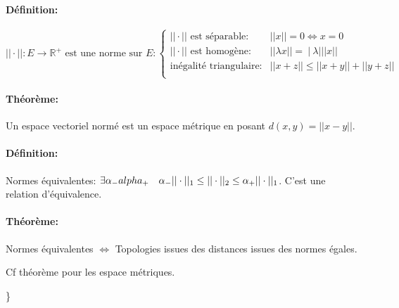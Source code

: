\documentclass[a4paper, 11pt, french]{book}
\theoremstyle{plain} %
\theoremstyle{definition} %
\theoremstyle{remark} %
\newcommand{\1}{\mathds{1}}
\newcommand\ens[2]{\{#1 \ |\ #2\}}
\begin{document}
\paragraph{Définition:}
$
	\text{$|| \cdot||:E\rightarrow\mathbb{R}^+$ est une norme sur $E$}:
	\left\ens{
	\begin{array}{ll}
		\text{$|| \cdot||$ est séparable:} & ||x||=0\iff x=0                 \\
		\text{$|| \cdot||$ est homogène:}  & || \lambda x||=}{\lambda| ||x|| \\
		\text{inégalité triangulaire:}     & ||x+z|| \le ||x+y||+||y+z||     \\
	\end{array}
	\right.
$

\paragraph{Théorème:} Un espace vectoriel normé est un espace métrique en posant $d(x, y)=||x-y||$.

\paragraph{Définition:} Normes équivalentes: $\exists\alpha_-\\alpha_+\quad\alpha_- || \cdot||_1\le || \cdot||_2\le\alpha_+ || \cdot||_1 $. C'est une relation d'équivalence.

\paragraph{Théorème:} Normes équivalentes $\iff$ Topologies issues des distances issues des normes égales.

\fbox{$\implies$} Cf théorème pour les espace métriques.

}
\end{document}
